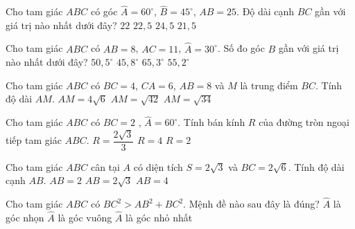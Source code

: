\begin{ex}%
	Cho tam giác $ABC$ có góc $\widehat{A}=60^{\circ}$, $\widehat{B}=45^{\circ}$, $AB=25$. Độ dài cạnh $BC$ gần với giá trị nào nhất dưới đây?
	\choice
	{$22$}
	{\True $22{,}5$}
	{$24{,}5$}
	{$21{,}5$}
\end{ex}

\begin{ex}%
	Cho tam giác $ABC$ có $AB=8$, $AC = 11$, $\widehat{A}=30^\circ$.  Số đo góc $B$ gần với giá trị nào nhất dưới đây?
	\choice
	{$50{,}5^\circ$}
	{$45{,}8^\circ$}
	{$65{,}3^\circ$}
	{\True $55{,}2^\circ$}
\end{ex}

\begin{ex}%
	Cho tam giác $ABC$ có $BC=4$, $CA=6$, $AB=8$ và $M$ là trung điểm $BC$. Tính độ dài $AM$.
	{$AM=4\sqrt{6}$}
	{$AM=\sqrt{42}$}
	{$AM=\sqrt{34}$}
\end{ex}

\begin{ex}%
	Cho tam giác $ABC$ có $BC=2$ , $\widehat{A}=60^\circ$. Tính bán kính $R$ của đường tròn ngoại tiếp tam giác $ABC$.
	{\True $R=\dfrac{2\sqrt{3}}{3}$}
	{$R=4$}
	{$R=2$}
\end{ex}

\begin{ex}%
	Cho tam giác $ABC$ cân tại $A$ có diện tích $S=2\sqrt{3}$ và $BC=2\sqrt{6}$. Tính độ dài cạnh $AB$.
	{$AB=2$}
	{$AB=2\sqrt{3}$}
	{$AB=4$}
\end{ex}

\begin{ex}%
	Cho tam giác $ABC$ có $BC^2>AB^2+BC^2$. Mệnh đề nào sau đây là đúng?
	{$\widehat{A}$ là góc nhọn}
	{$\widehat{A}$ là góc vuông}
	{$\widehat{A}$ là góc nhỏ nhất}
\end{ex}

